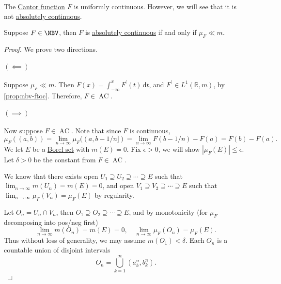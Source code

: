 \begin{eg}
	The \hyperref[sssec:Cantor-Function]{Cantor function} \(F\) is uniformly continuous.
	However, we will see that it is not \hyperref[def:absolutely-continuous-function]{absolutely continuous}.
\end{eg}

\begin{proposition}\label{prop:abs-cts}
	Suppose \(F \in \NBV\), then \(F\) is \hyperref[def:absolutely-continuous-function]{absolutely continuous} if and only if \(\mu_F \ll m\).
\end{proposition}
\begin{proof}
	We prove two directions.
	\paragraph{\((\impliedby)\)}
	Suppose \(\mu_F \ll m\). Then \(F(x) = \int_{-\infty}^x F^\prime (t) \,\mathrm{d}t\), and \(F^\prime \in L^1(\mathbb{R},m)\), by \autoref{prop:nbv-ftoc}. Therefore, \(F \in \operatorname{AC}\).

	\paragraph{\((\implies)\)}
	Now suppose \(F \in \operatorname{AC}\). Note that since \(F\) is continuous,
	\[
		\mu_F((a,b)) = \lim_{n \to \infty} \mu_F((a,b-1/n]) = \lim_{n \to \infty} F(b-1/n) - F(a) = F(b) - F(a).
	\]
	We let \(E\) be a \hyperref[def:Borel-set]{Borel set} with \(m(E) = 0\). Fix \(\epsilon > 0\), we will show \(\left\vert \mu_F(E) \right\vert \leq \epsilon \). Let \(\delta > 0\) be the constant from \(F \in \operatorname{AC}\).

	We know that there exists open \(U_1 \supseteq U_2 \supseteq \cdots \supseteq E\) such that \(\lim_{n \to \infty} m(U_n) = m(E) = 0\), and open \(V_1 \supseteq V_2 \supseteq \cdots \supseteq E\) such that \(\lim_{n \to \infty} \mu_F(V_n) = \mu_F(E)\) by regularity.

	Let \(O_n = U_n \cap V_n\), then \(O_1 \supseteq O_2 \supseteq \cdots \supseteq E\), and by monotonicity (for \(\mu_F\) decomposing into pos/neg first)
	\[
		\lim_{n \to \infty} m(O_n) = m(E) = 0,\quad \lim_{n \to \infty} \mu_F(O_n) = \mu_F(E).
	\]
	Thus without loss of generality, we may assume \(m(O_1) < \delta\). Each \(O_n\) is a countable union of disjoint intervals
	\[
		O_n = \bigcup_{k=1}^\infty \left( a_k^n, b_k^n \right).
	\]


\end{proof}
